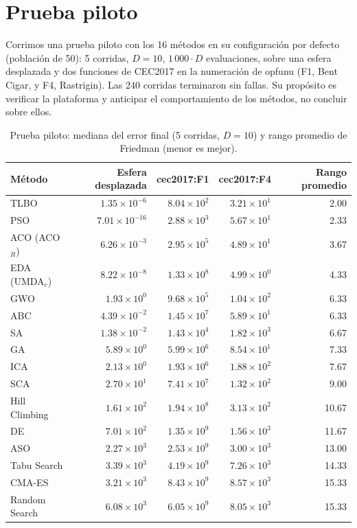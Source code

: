\documentclass[11pt,letterpaper]{article}
\begin{document}
\section{Prueba piloto}\label{sec:piloto}

Corrimos una prueba piloto con los 16 métodos en su configuración por defecto (población de 50): 5 corridas, $D=10$, $1\,000\cdot D$ evaluaciones, sobre una esfera desplazada y dos funciones de CEC2017 en la numeración de opfunu (F1, Bent Cigar, y F4, Rastrigin). Las 240 corridas terminaron sin fallas. Su propósito es verificar la plataforma y anticipar el comportamiento de los métodos, no concluir sobre ellos.

\begin{table}[H]
\centering
\caption{Prueba piloto: mediana del error final (5 corridas, $D=10$) y rango promedio de Friedman (menor es mejor).}
\label{tab:piloto}
\small
\begin{tabular}{@{}lrrrr@{}}
\toprule
Método & Esfera desplazada & cec2017:F1 & cec2017:F4 & Rango promedio \\
\midrule
TLBO & $1.35\times10^{-6}$ & $8.04\times10^{2}$ & $3.21\times10^{1}$ & 2.00 \\
PSO & $7.01\times10^{-16}$ & $2.88\times10^{3}$ & $5.67\times10^{1}$ & 2.33 \\
ACO (ACO$_R$) & $6.26\times10^{-3}$ & $2.95\times10^{5}$ & $4.89\times10^{1}$ & 3.67 \\
EDA (UMDA$_c$) & $8.22\times10^{-8}$ & $1.33\times10^{8}$ & $4.99\times10^{0}$ & 4.33 \\
GWO & $1.93\times10^{0}$ & $9.68\times10^{5}$ & $1.04\times10^{2}$ & 6.33 \\
ABC & $4.39\times10^{-2}$ & $1.45\times10^{7}$ & $5.89\times10^{1}$ & 6.33 \\
SA & $1.38\times10^{-2}$ & $1.43\times10^{4}$ & $1.82\times10^{3}$ & 6.67 \\
GA & $5.89\times10^{0}$ & $5.99\times10^{6}$ & $8.54\times10^{1}$ & 7.33 \\
ICA & $2.13\times10^{0}$ & $1.93\times10^{6}$ & $1.88\times10^{2}$ & 7.67 \\
SCA & $2.70\times10^{1}$ & $7.41\times10^{7}$ & $1.32\times10^{2}$ & 9.00 \\
Hill Climbing & $1.61\times10^{2}$ & $1.94\times10^{8}$ & $3.13\times10^{2}$ & 10.67 \\
DE & $7.01\times10^{2}$ & $1.35\times10^{9}$ & $1.56\times10^{3}$ & 11.67 \\
ASO & $2.27\times10^{3}$ & $2.53\times10^{9}$ & $3.00\times10^{3}$ & 13.00 \\
Tabu Search & $3.39\times10^{3}$ & $4.19\times10^{9}$ & $7.26\times10^{3}$ & 14.33 \\
CMA-ES & $3.21\times10^{3}$ & $8.43\times10^{9}$ & $8.57\times10^{3}$ & 15.33 \\
Random Search & $6.08\times10^{3}$ & $6.05\times10^{9}$ & $8.05\times10^{3}$ & 15.33 \\
\bottomrule
\end{tabular}
\end{table}
\end{document}
